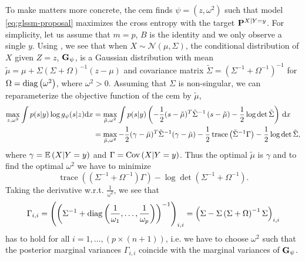 To make matters more concrete, the \gls{cem} finds $\psi = (z, \omega^{2})$ such that model \eqref{eq:glssm-proposal} maximizes the cross entropy with the target $\P^{X|Y=y}$. For simplicity, let us assume that $m = p$, $B$ is the identity and we only observe a single $y$. Using , we see that when $X\sim\mathcal N(\mu, \Sigma)$, the conditional distribution of $X$ given $Z=z$, $\G_{\psi}$, is a Gaussian distribution with mean $\tilde \mu =  \mu + \Sigma \left( \Sigma  + \Omega \right)^{-1} \left( z - \mu \right)$  and covariance matrix $\tilde\Sigma = \left( \Sigma ^{-1} + \Omega^{-1}\right)^{-1}$ for $\Omega = \diag \left( \omega^{2} \right)$, where $\omega^{2} > 0$. Assuming that $\Sigma$ is non-singular, we can reparameterize the objective function of the \gls{cem} by $\tilde \mu$,
\begin{align}
    \label{eq:cem_reparametrization}
    \begin{split}
    \max_{z, \omega^{2}} \int p(s|y) \log g_{\psi}(s|z) \mathrm dx &= \max_{\tilde\mu, \omega^{2}} \int p(s|y) \left( - \frac{1}{2} (s - \tilde \mu)^{T} \tilde \Sigma ^{-1} \left( s - \tilde \mu \right)  - \frac{1}{2} \log\det \tilde \Sigma \right)  \d x\\
&= \max_{\tilde \mu, \omega^{2}} - \frac{1}{2} (\gamma - \tilde \mu)^{T}\tilde \Sigma ^{-1} ( \gamma - \tilde \mu) - \frac{1}{2} \operatorname{trace} \left( \tilde \Sigma^{-1} \Gamma \right) - \frac{1}{2} \log\det\tilde\Sigma,
    \end{split}
\end{align}
where $\gamma = \E \left( X | Y = y \right)$ and $\Gamma = \cov \left( X | Y = y \right)$. 
Thus the optimal $\tilde \mu$ is $\gamma$ and to find the optimal $\omega^{2}$ we have to minimize 
$$
\operatorname{trace} \left( \left( \Sigma^{-1} + \Omega^{-1} \right) \Gamma \right) - \log\det \left( \Sigma^{-1} + \Omega^{-1} \right).
$$
Taking the derivative w.r.t. $\frac{1}{\omega^{2}}$, we see that 
\begin{align}
\label{eq:gamma_post}
\Gamma_{i,i} = \left(\left( \Sigma^{-1} + \diag \left( \frac{1}{\omega_{1}}, \dots, \frac{1}{\omega_{p}}\right) \right)^{-1}\right)_{i,i} = \left( \Sigma - \Sigma \left( \Sigma + \Omega \right)^{-1}\Sigma \right)_{i,i} %
\end{align}
has to hold for all $i = 1, \dots, (p \times (n + 1))$, i.e. we have to choose $\omega^{2}$ such that the posterior marginal variances $\Gamma_{i,i}$ coincide with the marginal variances of $\G_{\psi}$.

